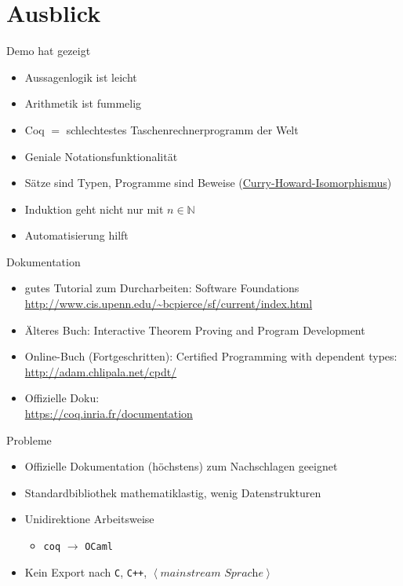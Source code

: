 \documentclass[aspectratio=169]{beamer}
\begin{document}
\section{Ausblick}
\begin{frame}
  \begin{center}
    \Large{Demo hat gezeigt}
  \end{center}
  \begin{itemize}
  \item Aussagenlogik ist leicht
  \item Arithmetik ist fummelig
  \item Coq $=$ schlechtestes Taschenrechnerprogramm der Welt
  \item Geniale Notationsfunktionalität
  \item Sätze sind Typen, Programme sind Beweise (\href{https://de.wikipedia.org/wiki/Curry-Howard-Isomorphismus}{Curry-Howard-Isomorphismus})
  \item Induktion geht nicht nur mit $n\in\mathbb{N}$
  \item Automatisierung hilft
  \end{itemize}
\end{frame}
\begin{frame}
  \begin{center}
    \Large{Dokumentation}
  \end{center}
  \begin{itemize}
  \item gutes Tutorial zum Durcharbeiten: Software Foundations\\
    \qquad \url{http://www.cis.upenn.edu/~bcpierce/sf/current/index.html}
  \item Älteres Buch: Interactive Theorem Proving and Program Development
  \item Online-Buch (Fortgeschritten): Certified Programming with dependent types:\\
    \qquad \url{http://adam.chlipala.net/cpdt/}
  \item Offizielle Doku:\\
    \qquad \url{https://coq.inria.fr/documentation}
  \end{itemize}
\end{frame}
\begin{frame}
  \begin{center}
    \Large{Probleme}
  \end{center}
  \begin{itemize}
  \item Offizielle Dokumentation (höchstens) zum Nachschlagen geeignet
  \item Standardbibliothek mathematiklastig, wenig Datenstrukturen
  \item Unidirektione Arbeitsweise 
    \begin{itemize}
    \item \texttt{coq} $\longrightarrow$ \texttt{OCaml}
    \end{itemize}
  \item Kein Export nach \texttt{C}, \texttt{C++}, $\left<\textit{mainstream Sprache}\right>$
  \end{itemize}
\end{frame} %
\end{document}
